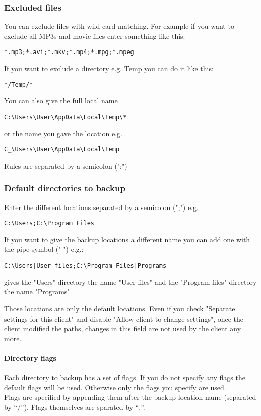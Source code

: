 \documentclass[a4paper,10pt]{article}
\begin{document}
\subsubsection{Excluded files}
\label{subsub_excluded_files}

You can exclude files with wild card matching. For example if you want to exclude all MP3s and movie files enter something like this:
\begin{verbatim}
*.mp3;*.avi;*.mkv;*.mp4;*.mpg;*.mpeg
\end{verbatim}
If you want to exclude a directory e.g. Temp you can do it like this:
\begin{verbatim}
*/Temp/*
\end{verbatim}
You can also give the full local name
\begin{verbatim}
C:\Users\User\AppData\Local\Temp\*
\end{verbatim}
or the name you gave the location e.g.
\begin{verbatim}
C_\Users\User\AppData\Local\Temp
\end{verbatim}

Rules are separated by a semicolon (";")

\subsubsection{Default directories to backup}
\label{subsub_default_dirs}

Enter the different locations separated by a semicolon (";") e.g.
\begin{verbatim}
C:\Users;C:\Program Files
\end{verbatim}
If you want to give the backup locations a different name you can add one with the pipe symbol ("|") e.g.:
\begin{verbatim}
C:\Users|User files;C:\Program Files|Programs
\end{verbatim}
gives the "Users" directory the name "User files" and the "Program files" directory the name "Programs".

Those locations are only the default locations. Even if you check "Separate settings for this client" and disable "Allow client to change settings", once the client modified the paths, changes in this field are not used by the client any more.

\paragraph{Directory flags}
Each directory to backup has a set of flags. If you do not specify any flags the default flags will be used. Otherwise only the flags you specify are used.\\
Flags are specified by appending them after the backup location name (separated by ``/''). Flags themselves are sparated by ``,''.
\end{document}
